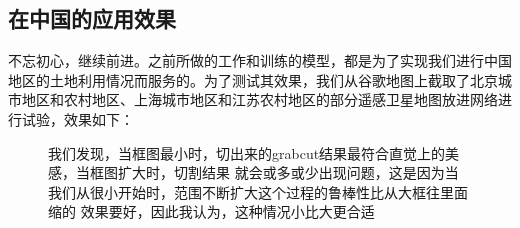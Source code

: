 \documentclass[a4paper,12pt]{article}
\begin{document}
\begin{CJK*}{UTF8}{gbsn}
\begin{spacing}{1.2}
    \section{在中国的应用效果}
    不忘初心，继续前进。之前所做的工作和训练的模型，都是为了实现我们进行中国地区的土地利用情况而服务的。为了测试其效果，我们从谷歌地图上\cite{}截取了北京城市地区和农村地区、上海城市地区和江苏农村地区的部分遥感卫星地图放进网络进行试验，效果如下：
    \begin{figure}
        \centering
        \hspace{1in}
        \hspace{1in}
        \hspace{1in}
        \hspace{1in}
        \caption{我们发现，当框图最小时，切出来的grabcut结果最符合直觉上的美感，当框图扩大时，切割结果  就会或多或少出现问题，这是因为当我们从很小开始时，范围不断扩大这个过程的鲁棒性比从大框往里面缩的  效果要好，因此我认为，这种情况小比大更合适}
        \label{figb} %
    \end{figure}

    
    
    
\end{spacing}
\end{CJK*}
\end{document}
